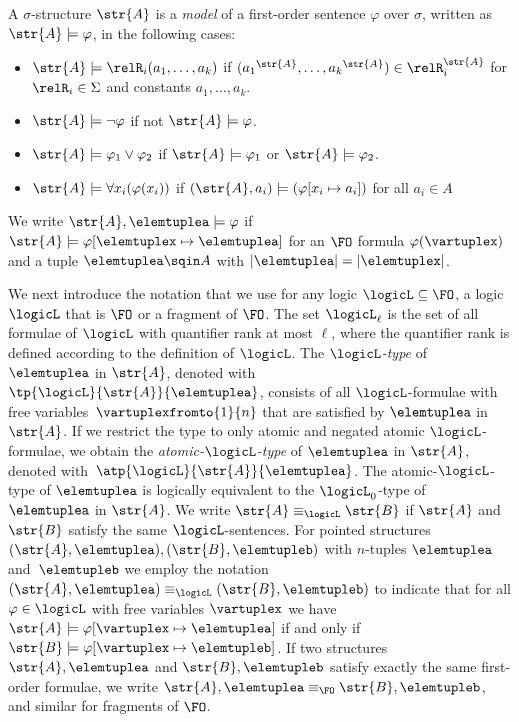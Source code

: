 \begin{definition}
  A $\sigma$-structure $\str{A}$ is a \emph{model} of a first-order sentence $\varphi$ over $\sigma$, written as $\str{A} \models \varphi$, in the following cases:
\begin{itemize}
  \item $\str{A} \models \relR_{i}(a_{1}, \ldots, a_{k})$ if $({a_{1}}^{\str{A}}, \ldots, {a_{k}}^{\str{A}}) \in \relR_{i}^{\str{A}}$ for $\relR_{i} \in \Sigma$ and constants $a_{1}, \ldots, a_{k}$.
  \item $\str{A} \models \neg \varphi$ if not $\str{A} \models \varphi$.
  \item $\str{A} \models \varphi_{1} \lor \varphi_{2}$ if $\str{A} \models \varphi_{1}$ or $\str{A} \models \varphi_{2}$.
  \item $\str{A} \models \forall{x_{i}} (\varphi(x_{i}))$ if $(\str{A}, a_{i}) \models (\varphi[x_{i} \mapsto a_{i}])$ for all $a_{i} \in A$
\end{itemize}
We write $\str{A}, \elemtuplea \models \varphi$ if $\str{A} \models \varphi[\elemtuplex \mapsto \elemtuplea]$ for an $\FO$ formula $\varphi(\vartuplex)$ and a tuple $\elemtuplea \sqin A$ with $|\elemtuplea| = |\elemtuplex|$.
\end{definition}

We next introduce the notation that we use for any logic $\logicL \subseteq \FO$, \ie{} a logic $\logicL$ that is $\FO$ or a fragment of $\FO$.
The set $\logicL_{\ell}$ is the set of all formulae of $\logicL$ with quantifier rank at most $\ell$, where the quantifier rank is defined according to the definition of $\logicL$.
The \emph{$\logicL$-type} of $\elemtuplea$ in $\str{A}$, denoted with~$\tp{\logicL}{\str{A}}{\elemtuplea}$, consists of all $\logicL$-formulae with free variables~$\vartuplexfromto{1}{n}$ that are satisfied by $\elemtuplea$ in $\str{A}$.
If we restrict the type to only atomic and negated atomic $\logicL$-formulae, we obtain the \emph{atomic-$\logicL$-type} of $\elemtuplea$ in $\str{A}$, denoted with~$\atp{\logicL}{\str{A}}{\elemtuplea}$.
The atomic-$\logicL$-type of $\elemtuplea$ is logically equivalent to the $\logicL_{0}$-type of $\elemtuplea$ in $\str{A}$.
We write $\str{A} \equiv_\logicL \str{B}$ if $\str{A}$ and~$\str{B}$ satisfy the same $\logicL$-sentences.
For pointed structures $(\str{A}, \elemtuplea), (\str{B}, \elemtupleb)$ with $n$-tuples $\elemtuplea$ and~$\elemtupleb$ we employ the notation $(\str{A}, \elemtuplea) \equiv_\logicL (\str{B}, \elemtupleb)$ to indicate that for all $\varphi \in \logicL$ with free variables $\vartuplex$ we have $\str{A} \models \varphi[\vartuplex \mapsto \elemtuplea]$ if and only if $\str{B} \models \varphi[\vartuplex \mapsto \elemtupleb]$.
If two structures $\str{A}, \elemtuplea$ and $\str{B}, \elemtupleb$ satisfy exactly the same first-order formulae, we write $\str{A}, \elemtuplea \equiv_{\FO} \str{B}, \elemtupleb$, and similar for fragments of $\FO$.

